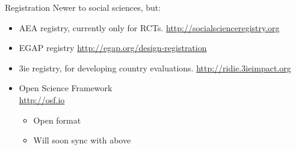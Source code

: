 \documentclass{beamer}
\begin{document}
\begin{frame}{Registration}
  Newer to social sciences, but:
   \begin{itemize}[<.->]
   \item
   	AEA registry, currently only for RCTs. \url{http://socialscienceregistry.org}
   \item
    EGAP registry \url{http://egap.org/design-registration}
   \item 
    3ie registry, for developing country evaluations. \url{http://ridie.3ieimpact.org}
   \item
   	Open Science Framework\\ \url{http://osf.io}
   	\begin{itemize}
   	\item
   	Open format
   	\item
   	Will soon sync with above
   	\end{itemize}
   \end{itemize} 
\end{frame}

 { %
    \begin{frame}[plain, label=AEAreg]
     \end{frame}
}
\end{document}
